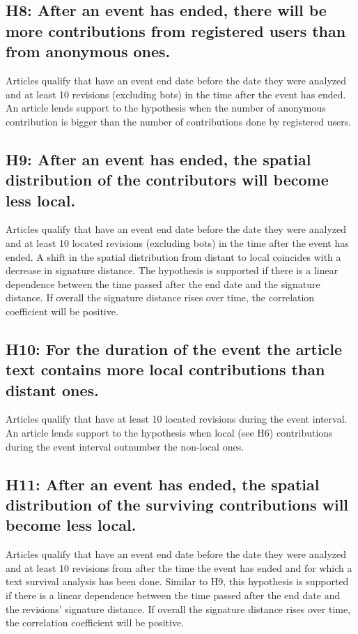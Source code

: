\subsection*{H8: After an event has ended, there will be more contributions from registered users than from anonymous ones.}

Articles qualify that have an event end date before the date they were analyzed and at least 10 revisions (excluding bots) in the time after the event has ended.
An article lends support to the hypothesis when the number of anonymous contribution is bigger than the number of contributions done by registered users.

\subsection*{H9: After an event has ended, the spatial distribution of the contributors will become less local.}

Articles qualify that have an event end date before the date they were analyzed and at least 10 located revisions (excluding bots) in the time after the event has ended.
A shift in the spatial distribution from distant to local coincides with a decrease in signature distance.
The hypothesis is supported if there is a linear dependence between the time passed after the end date and the signature distance.
If overall the signature distance rises over time, the correlation coefficient will be positive.


\subsection*{H10: For the duration of the event the article text contains more local contributions than distant ones.}

Articles qualify that have at least 10 located revisions during the event interval.
An article lends support to the hypothesis when local (see H6) contributions during the event interval outnumber the non-local ones.

\subsection*{H11: After an event has ended, the spatial distribution of the surviving contributions will become less local.}

Articles qualify that have an event end date before the date they were analyzed and at least 10 revisions from after the time the event has ended and for which a text survival analysis has been done.
Similar to H9, this hypothesis is supported if there is a linear dependence between the time passed after the end date and the revisions' signature distance.
If overall the signature distance rises over time, the correlation coefficient will be positive.


